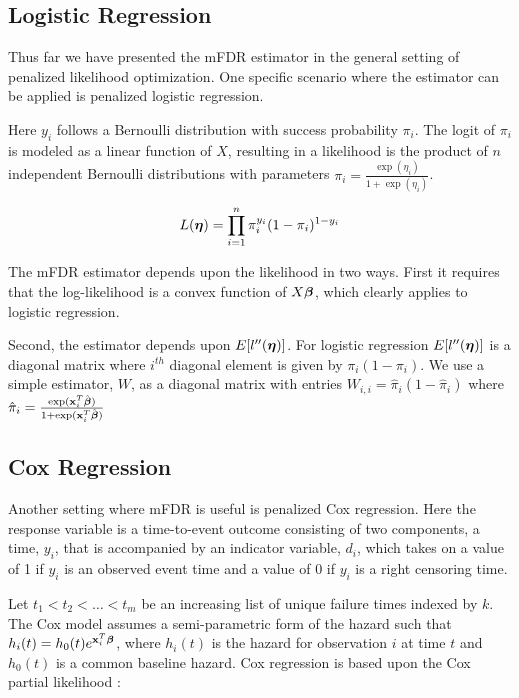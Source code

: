 \subsection{Logistic Regression}

Thus far we have presented the mFDR estimator in the general setting of penalized likelihood optimization. One specific scenario where the estimator can be applied is penalized logistic regression.  

Here $y_i$ follows a  Bernoulli distribution with success probability $\pi_i$.  The logit of $\pi_i$ is modeled as a linear function of $X$, resulting in a likelihood is the product of $n$ independent Bernoulli distributions with parameters $\pi_i = \frac{\exp(\eta_i)} {1 + \exp(\eta_i)}$.

\begin{equation*}
L(\boldsymbol{\eta}) = \prod_{i=1}^{n} \pi_i^{y_i} (1 - \pi_i)^{1 - y_i}
\end{equation*}

The mFDR estimator depends upon the likelihood in two ways.  First it requires that the log-likelihood is a convex function of $X\boldsymbol{\beta}$, which clearly applies to logistic regression.  

Second, the estimator depends upon $E[l''(\boldsymbol{\eta})]$.  For logistic regression $E[l''(\boldsymbol{\eta})]$ is a diagonal matrix where $i^{th}$ diagonal element is given by $\pi_i(1 - \pi_i)$.  We use a simple estimator, $W$, as a diagonal matrix with entries $W_{i,i} = \hat{\pi}_i(1 - \hat{\pi}_i)$ where $\hat{\pi}_i = \frac{\exp(\mathbf{x}_i^T\hat{\boldsymbol{\beta}})} {1 +\exp(\mathbf{x}_i^T\hat{\boldsymbol{\beta}})}$

\subsection{Cox Regression}

Another setting where mFDR is useful is penalized Cox regression. Here the response variable is a time-to-event outcome consisting of two components, a time, $y_i$, that is accompanied by an indicator variable, $d_i$, which takes on a value of 1 if $y_i$ is an observed event time and a value of 0 if $y_i$ is a right censoring time.  

Let $t_1 < t_2 < \ldots < t_m$ be an increasing list of unique failure times indexed by $k$. The Cox model assumes a semi-parametric form of the hazard such that $h_i(t) = h_0(t)e^{\mathbf{x}_i^T \boldsymbol{\beta}}$, where $h_i(t)$ is the hazard for observation $i$ at time $t$ and $h_0(t)$ is a common baseline hazard. Cox regression is based upon the Cox partial likelihood \citep{Cox1972}:

